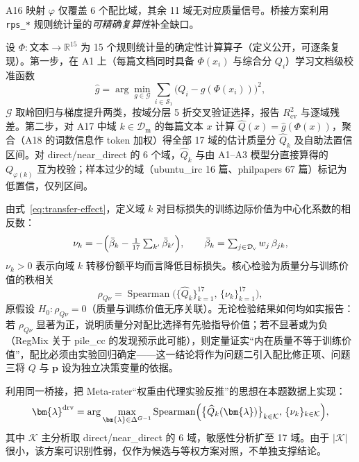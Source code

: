 A16 映射 $\varphi$ 仅覆盖 6 个配比域，其余 11 域无对应质量信号。桥接方案利用 \texttt{rps\_*} 规则统计量的\emph{可精确复算性}补全缺口。

\begin{definition}[规则特征复算与校准函数]\label{def:calibration}
设 $\Phi:\text{文本}\to\mathbb{R}^{15}$ 为 15 个规则统计量的确定性计算算子（定义公开，可逐条复现）。第一步，在 A1 上（每篇文档同时具备 $\Phi(x_i)$ 与综合分 $Q_i$）学习文档级校准函数
\begin{equation}
  \hat g=\arg\min_{g\in\mathcal{G}}
  \sum_{i\in\mathcal{S}_1}\bigl(Q_i-g(\Phi(x_i))\bigr)^2,
  \label{eq:calib}
\end{equation}
$\mathcal{G}$ 取岭回归与梯度提升两类，按域分层 5 折交叉验证选择，报告 $R^2_{\mathrm{cv}}$ 与逐域残差。第二步，对 A17 中域 $k\in\mathcal{D}_{\mathrm{m}}$ 的每篇文本 $x$ 计算 $\widehat Q(x)=\hat g(\Phi(x))$，聚合（A18 的词数信息作 token 加权）得全部 17 域的估计质量分 $\widehat Q_k$ 及自助法置信区间。对 direct/near\_direct 的 6 个域，$\widehat Q_k$ 与由 A1--A3 模型分直接算得的 $Q_{\varphi(k)}$ 互为校验；样本过少的域（ubuntu\_irc 16 篇、philpapers 67 篇）标记为低置信，仅列区间。
\end{definition}

\begin{definition}[训练边际价值与解耦检验]\label{def:value}
由式~\eqref{eq:transfer-effect}，定义域 $k$ 对目标损失的训练边际价值为中心化系数的相反数：
\begin{equation}
  \nu_k=-\Bigl(\bar\beta_k-\tfrac{1}{17}\textstyle\sum_{k'}\bar\beta_{k'}\Bigr),
  \qquad
  \bar\beta_k=\sum_{j\in\mathcal{D}_{\mathrm{v}}} w_j\,\beta_{jk},
  \label{eq:value}
\end{equation}
$\nu_k>0$ 表示向域 $k$ 转移份额平均而言降低目标损失。核心检验为质量分与训练价值的秩相关
\begin{equation}
  \rho_{Q\nu}=\operatorname{Spearman}\bigl(\{\widehat Q_k\}_{k=1}^{17},\,\{\nu_k\}_{k=1}^{17}\bigr),
  \label{eq:decouple}
\end{equation}
原假设 $H_0:\rho_{Q\nu}=0$（质量与训练价值无序关联）。无论检验结果如何均如实报告：若 $\rho_{Q\nu}$ 显著为正，说明质量分对配比选择有先验指导价值；若不显著或为负（RegMix 关于 pile\_cc 的发现预示此可能），则定量证实“内在质量不等于训练价值”，配比必须由实验回归确定——这一结论将作为问题二引入配比修正项、问题三将 $Q$ 与 $\bm{p}$ 设为独立决策变量的依据。
\end{definition}

\begin{definition}\label{def:lambda-driven}
利用同一桥接，把 Meta-rater“权重由代理实验反推”的思想在本题数据上实现：
\begin{equation}
  \bm{\lambda}^{\mathrm{drv}}
  =\arg\max_{\bm{\lambda}\in\Delta^{G-1}}
  \operatorname{Spearman}\Bigl(\bigl\{\widehat Q_k(\bm{\lambda})\bigr\}_{k\in\mathcal{K}},\,
  \{\nu_k\}_{k\in\mathcal{K}}\Bigr),
  \label{eq:lambda-driven}
\end{equation}
其中 $\mathcal{K}$ 主分析取 direct/near\_direct 的 6 域，敏感性分析扩至 17 域。由于 $|\mathcal{K}|$ 很小，该方案可识别性弱，仅作为候选与等权方案对照，不单独支撑结论。
\end{definition}


